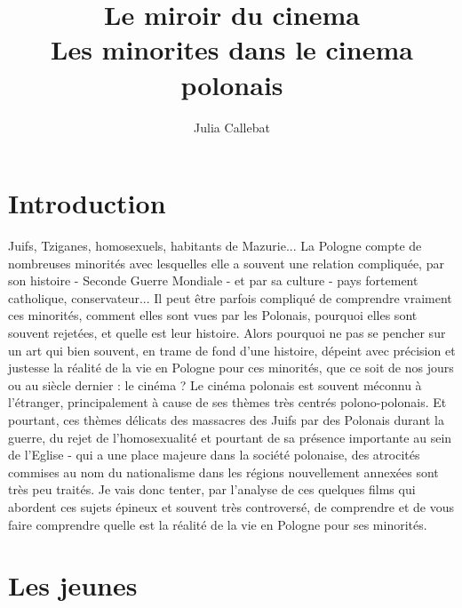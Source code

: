 \documentclass[12pt]{amsart}
\title{Le miroir du cinema \\ Les minorites dans le cinema polonais}
\author{Julia Callebat}
\begin{document}
\maketitle

\cleardoublepage
\tableofcontents
\cleardoublepage
\section*{Introduction}
Juifs, Tziganes, homosexuels, habitants de Mazurie... La Pologne compte de nombreuses minorités avec lesquelles elle a souvent une relation compliquée, par son histoire - Seconde Guerre Mondiale - et par sa culture - pays fortement catholique, conservateur... Il peut être parfois compliqué de comprendre vraiment ces minorités, comment elles sont vues par les Polonais, pourquoi elles sont souvent rejetées, et quelle est leur histoire. Alors pourquoi ne pas se pencher sur un art qui bien souvent, en trame de fond d'une histoire, dépeint avec précision et justesse la réalité de la vie en Pologne pour ces minorités, que ce soit de nos jours ou au siècle dernier : le cinéma ?
Le cinéma polonais est souvent méconnu à l'étranger, principalement à cause de ses thèmes très centrés polono-polonais. Et pourtant, ces thèmes délicats des massacres des Juifs par des Polonais durant la guerre, du rejet de l'homosexualité et pourtant de sa présence importante au sein de l'Eglise - qui a une place majeure dans la société polonaise, des atrocités commises au nom du nationalisme dans les régions nouvellement annexées sont très peu traités. 
Je vais donc tenter, par l'analyse de ces quelques films qui abordent ces sujets épineux et souvent très controversé, de comprendre et de vous faire comprendre quelle est la réalité de la vie en Pologne pour ses minorités. 

\clearpage
\section{Les jeunes}
\end{document}
